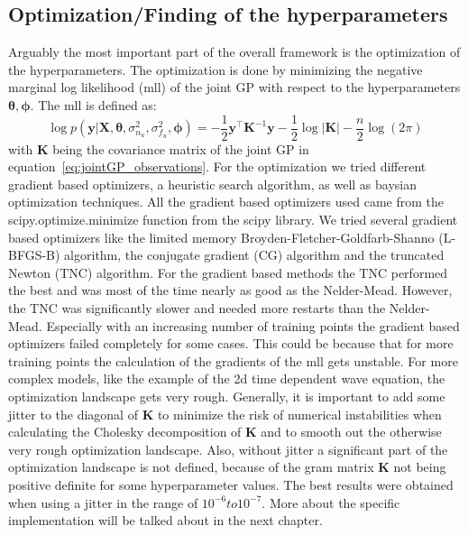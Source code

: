 \documentclass{article}
\begin{document}
\subsection{Optimization/Finding of the hyperparameters}
Arguably the most important part of the overall framework is the optimization of the hyperparameters. The optimization is done by minimizing the negative marginal log likelihood (mll) of the joint GP with respect to the hyperparameters $\bm{\theta, \phi}$. The mll is defined as:
\begin{equation}
    \label{eq:mll}
    \log p(\bm{y}|\bm{X},\bm{\theta},\sigma_{n_u}^2,\sigma_{f_u}^2,\bm{\phi}) =
    -\frac{1}{2}\bm{y}^\intercal \bm{K}^{-1}\bm{y} - \frac{1}{2}\log\left\lvert \bm{K}\right\rvert - \frac{n}{2}\log(2\pi)
\end{equation}
with $\bm{K}$ being the covariance matrix of the joint GP in equation~\ref{eq:jointGP_observations}. For the optimization we tried different gradient based optimizers, a heuristic search algorithm, as well as baysian optimization techniques. All the gradient based optimizers used came from the scipy.optimize.minimize function from the scipy library. We tried several gradient based optimizers like the limited memory Broyden-Fletcher-Goldfarb-Shanno (L-BFGS-B) algorithm, the conjugate gradient (CG) algorithm and the truncated Newton (TNC) algorithm. For the gradient based methods the TNC performed the best and was most of the time nearly as good as the Nelder-Mead. However, the TNC was significantly slower and needed more restarts than the Nelder-Mead. Especially with an increasing number of training points the gradient based optimizers failed completely for some cases. This could be because that for more training points the calculation of the gradients of the mll gets unstable. For more complex models, like the example of the 2d time dependent wave equation, the optimization landscape gets very rough.  Generally, it is important to add some jitter to the diagonal of $\bm{K}$ to minimize the risk of numerical instabilities when calculating the Cholesky decomposition of $\bm{K}$ and to smooth out the otherwise very rough optimization landscape. Also, without jitter a significant part of the optimization landscape is not defined, because of the  gram matrix $\bm{K}$ not being positive definite for some hyperparameter values. The best results were obtained when using a jitter in the range of $10^{-6} to 10^{-7}$. More about the specific implementation will be talked about in the next chapter.\\
\\
\end{document}
